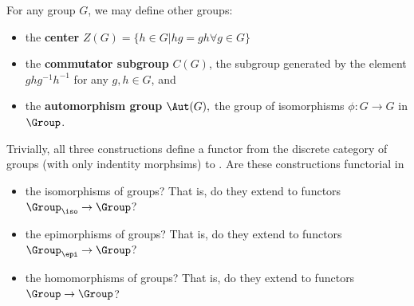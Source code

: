 \documentclass[main.tex]{subfiles}
\begin{document}
\begin{exercise}
For any group $G$, we may define other groups: 
\begin{itemize}
    \item the \textbf{center} $Z(G) = \{h \in G | hg = gh \forall g\in G\}$
    \item the \textbf{commutator subgroup} $C(G)$, the subgroup generated by the element $ghg^{-1}h^{-1}$ for any $g,h \in G$, and
    \item the \textbf{automorphism group} $ \Aut(G), $ the group of isomorphisms $\phi\colon G \rightarrow G$ in $\Group$.
\end{itemize}
Trivially, all three constructions define a functor from the discrete category of groups (with only indentity morphsims) to \Group. Are these constructions functorial in 
\begin{itemize}
    \item the isomorphisms of groups? That is, do they extend to functors $\Group_{\iso} \rightarrow \Group$?
    \item the epimorphisms of groups? That is, do they extend to functors $\Group_{\epi} \rightarrow \Group$?
    \item the homomorphisms of groups? That is, do they extend to functors $\Group \rightarrow \Group$?
\end{itemize}
\end{exercise}
\end{document}
